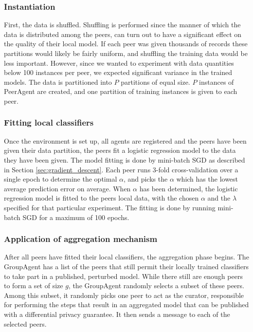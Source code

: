 \subsubsection{Instantiation}


First, the data is shuffled. Shuffling is performed since the manner of which the data is distributed among the peers, can turn out to have a significant effect on the quality of their local model. If each peer was given thousands of records these partitions would likely be fairly uniform, and shuffling the training data would be less important. However, since we wanted to experiment with data quantities below 100 instances per peer, we expected significant variance in the trained models. The data is partitioned into $P$ partitions of equal size. $P$ instances of PeerAgent are created, and one partition of training instances is given to each peer.

\subsubsection{Fitting local classifiers}

Once the environment is set up, all agents are registered and the peers have been given their data partition, the peers fit a logistic regression model to the data they have been given. The model fitting is done by mini-batch SGD as described in Section \ref{sec:gradient_descent}. Each peer runs 3-fold cross-validation over a single epoch to determine the optimal $\alpha$, and picks the $\alpha$ which has the lowest average prediction error on average. When $\alpha$ has been determined, the logistic regression model is fitted to the peers local data, with the chosen $\alpha$ and the $\lambda$ specified for that particular experiment. The fitting is done by running mini-batch SGD for a maximum of 100 epochs.

\subsubsection{Application of aggregation mechanism}

After all peers have fitted their local classifiers, the aggregation phase begins. The GroupAgent has a list of the peers that still permit their locally trained classifiers to take part in a published, perturbed model. While there still are enough peers to form a set of size $g$, the GroupAgent randomly selects a subset of these peers. Among this subset, it randomly picks one peer to act as the curator, responsible for performing the steps that result in an aggregated model that can be published with a differential privacy guarantee. It then sends a message to each of the selected peers.

